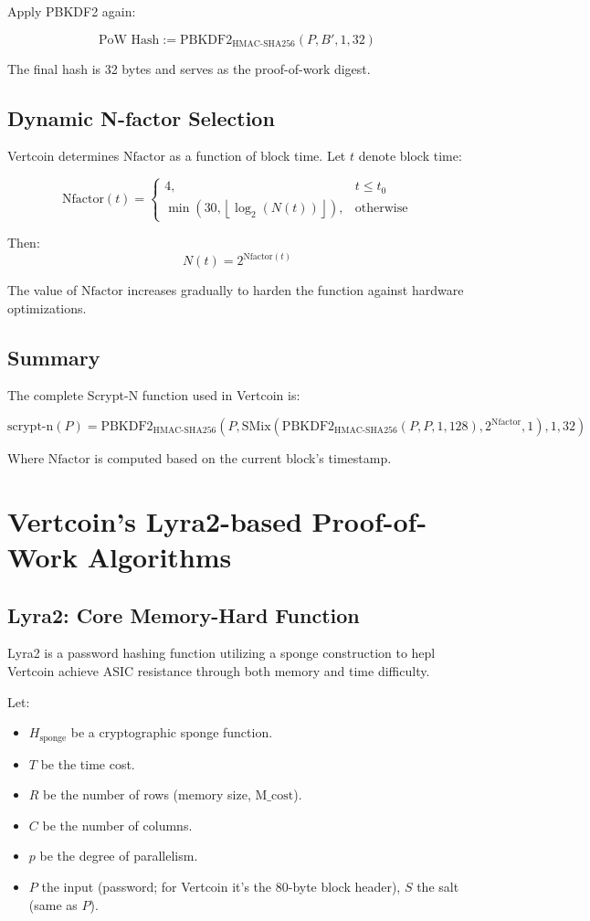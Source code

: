 \documentclass[12pt]{article}
\begin{document}
Apply PBKDF2 again:

\[
\text{PoW Hash} := \text{PBKDF2}_{\text{HMAC-SHA256}}(P, B', 1, 32)
\]

The final hash is 32 bytes and serves as the proof-of-work digest.

\subsection{Dynamic N-factor Selection}

Vertcoin determines \( \text{Nfactor} \) as a function of block time. Let \( t \) denote block time:

\[
\text{Nfactor}(t) =
\begin{cases}
4, & t \leq t_0 \\
\min(30, \left\lfloor \log_2(N(t)) \right\rfloor), & \text{otherwise}
\end{cases}
\]

Then:
\[
N(t) = 2^{\text{Nfactor}(t)}
\]

The value of \( \text{Nfactor} \) increases gradually to harden the function against hardware optimizations.

\subsection{Summary}

The complete Scrypt-N function used in Vertcoin is:

\[
\text{scrypt-n}(P) = \text{PBKDF2}_{\text{HMAC-SHA256}}\left(P, \text{SMix}\left(\text{PBKDF2}_{\text{HMAC-SHA256}}(P, P, 1, 128), 2^{\text{Nfactor}}, 1\right), 1, 32\right)
\]

Where \( \text{Nfactor} \) is computed based on the current block's timestamp.

\section{Vertcoin's Lyra2-based Proof-of-Work Algorithms}

\subsection{Lyra2: Core Memory-Hard Function}

Lyra2 is a password hashing function utilizing a sponge construction to hepl Vertcoin achieve ASIC resistance through both memory and time difficulty.

Let:
\begin{itemize}
    \item $H_{\text{sponge}}$ be a cryptographic sponge function.
    \item $T$ be the time cost.
    \item $R$ be the number of rows (memory size, $\text{M\_cost}$).
    \item $C$ be the number of columns.
    \item $p$ be the degree of parallelism.
    \item $P$ the input (password; for Vertcoin it's the 80-byte block header), $S$ the salt (same as $P$).
\end{itemize}
\end{document}
